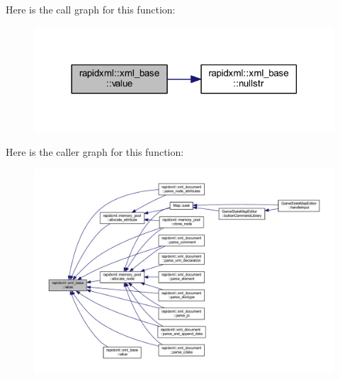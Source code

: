 Here is the call graph for this function\+:\nopagebreak
\begin{figure}[H]
\begin{center}
\leavevmode
\includegraphics[width=318pt]{classrapidxml_1_1xml__base_adcdaccff61c665f039d9344e447b7445_cgraph}
\end{center}
\end{figure}




Here is the caller graph for this function\+:
\nopagebreak
\begin{figure}[H]
\begin{center}
\leavevmode
\includegraphics[width=350pt]{classrapidxml_1_1xml__base_adcdaccff61c665f039d9344e447b7445_icgraph}
\end{center}
\end{figure}


